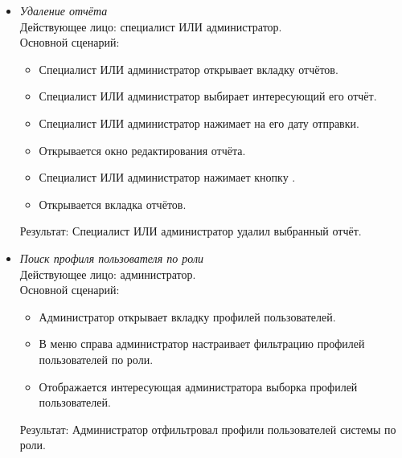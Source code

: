 \begin{itemize}[topsep=0pt, parsep=0pt, itemsep=0pt, leftmargin=*, labelindent=0.5cm]
	\item \textit{Удаление отчёта} \\
	Действующее лицо: специалист ИЛИ администратор. \\
	Основной сценарий:
	\begin{itemize}[topsep=0pt, parsep=0pt, itemsep=0pt, leftmargin=*, labelindent=0.5cm]
		\item Специалист ИЛИ администратор открывает вкладку отчётов.
		\item Специалист ИЛИ администратор выбирает интересующий его отчёт.
		\item Специалист ИЛИ администратор нажимает на его дату отправки.
		\item Открывается окно редактирования отчёта.
		\item Специалист ИЛИ администратор нажимает кнопку .
		\item Открывается вкладка отчётов.
	\end{itemize}
	Результат: Специалист ИЛИ администратор удалил выбранный отчёт.
\end{itemize}

\begin{itemize}[topsep=0pt, parsep=0pt, itemsep=0pt, leftmargin=*, labelindent=0.5cm]
	\item \textit{Поиск профиля пользователя по роли} \\
	Действующее лицо: администратор. \\
	Основной сценарий:
	\begin{itemize}[topsep=0pt, parsep=0pt, itemsep=0pt, leftmargin=*, labelindent=0.5cm]
		\item Администратор открывает вкладку профилей пользователей.
		\item В меню справа администратор настраивает фильтрацию профилей пользователей по роли.
		\item Отображается интересующая администратора выборка профилей пользователей.
	\end{itemize}
	Результат: Администратор отфильтровал профили пользователей системы по роли.
\end{itemize}

